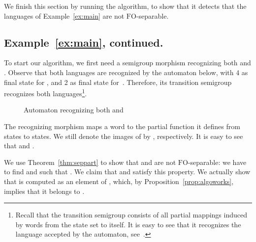 \documentclass{CSML}
\newcommand{\fo}{\ensuremath{\text{FO}}\xspace}
\theoremstyle{plain}
\begin{document}
\smallskip
We finish this section by running the algorithm, to show that it
detects that the languages of Example~\ref{ex:main} are not
\fo-separable.

\subsection{Example~\ref{ex:main}, continued.}
To start our algorithm, we first need a semigroup morphism recognizing
both  and . Observe that both languages are recognized by
the automaton below, with 4 as final state for , and 2 as final state for~.
Therefore, its transition semigroup~ recognizes both
languages\footnote{Recall that the transition semigroup consists of
  all partial mappings induced by words from the state set to itself. It
  is easy to see that it recognizes the language accepted by the
  automaton, see~\cite[Sec.~3.1]{Pin13:MPRI}.}.
\begin{figure}[h]
  \begin{center}
  \end{center}
  \caption{Automaton recognizing both  and }
  \label{fig:automtonA}
\end{figure}
The recognizing morphism  maps a word to the partial
function it defines from states to states. We still denote the
images of  by , respectively.  It is easy
to see that  and .

We use Theorem~\ref{thm:seppart} to show that  and  are
not \fo-separable: we have to find  and  such that . We claim that
 and  satisfy this property. We actually show
that  is computed as an element of , which,
by Proposition~\ref{prop:algoworks}, implies that it belongs to
.
\end{document}
